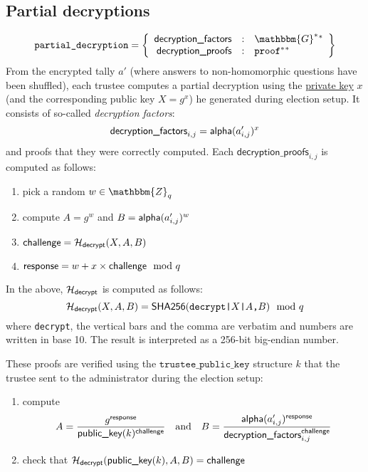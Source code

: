 \documentclass[a4paper]{article}
\newcommand{\G}{\mathbbm{G}}
\newcommand{\Z}{\mathbbm{Z}}
\newcommand{\shatwo}{\textsf{SHA256}}
\newcommand{\tpk}{\texttt{trustee\_public\_key}}
\newcommand{\pdecryption}{\texttt{partial\_decryption}}
\begin{document}
\subsection{Partial decryptions}

\newcommand{\dfactors}{\textsf{decryption\_factors}}
\newcommand{\dproofs}{\textsf{decryption\_proofs}}
\newcommand{\decrypt}{\textsf{decrypt}}

\begin{gather*}
  \pdecryption=\left\{
    \begin{array}{rcl}
      \dfactors&:&\G^\ast{}^\ast\\
      \dproofs&:&\proof^\ast{}^\ast
    \end{array}
  \right\}
\end{gather*}
From the encrypted tally $a'$ (where answers to non-homomorphic questions
have been shuffled), each trustee computes a partial decryption using
the \hyperref[trustee-keys]{private key} $x$ (and the corresponding
public key $X=g^x$) he generated during election setup. It consists of
so-called \emph{decryption factors}:
\[
\dfactors_{i,j}=\alphalabel(a'_{i,j})^x
\]
and proofs that they were correctly computed. Each $\dproofs_{i,j}$ is
computed as follows:
\begin{enumerate}
\item pick a random $w\in\Z_q$
\item compute $A=g^w$ and $B=\textsf{alpha}(a'_{i,j})^w$
\item $\challenge=\Hash_\decrypt(X,A,B)$
\item $\textsf{response}=w+x\times\textsf{challenge}\mod q$
\end{enumerate}
In the above, $\Hash_\decrypt$ is computed as follows:
\[
\Hash_\decrypt(X,A,B)=\shatwo(\verb=decrypt|=X\verb=|=A\verb=,=B)\mod q
\]
where \verb=decrypt=, the vertical bars and the comma are verbatim and
numbers are written in base 10. The result is interpreted as a 256-bit
big-endian number.

These proofs are verified using the $\tpk$ structure $k$ that the
trustee sent to the administrator during the election setup:
\begin{enumerate}
\item compute
\[
A=\frac{g^\response}{\pklabel(k)^\challenge}
\quad\text{and}\quad
B=\frac{\alphalabel(a'_{i,j})^\response}{\dfactors_{i,j}^\challenge}
\]
\item check that $\Hash_\decrypt(\pklabel(k),A,B)=\challenge$
\end{enumerate}
\end{document}
